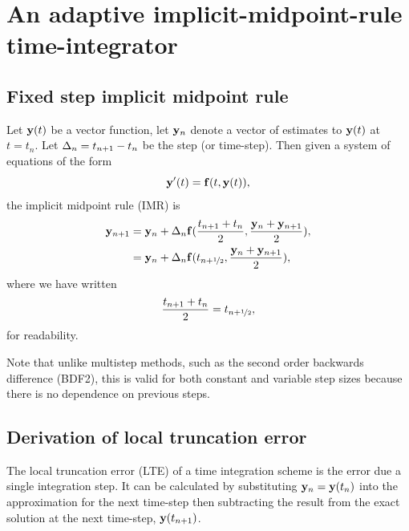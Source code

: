

\section{An adaptive implicit-midpoint-rule time-integrator}





\subsection{Fixed step implicit midpoint rule}

Let $\mathbf{y}(t)$ be a vector function, let $\mathbf{y}_n$ denote a vector of estimates to $\mathbf{y}(t)$ at $t = t_n$.
Let $\Delta_{n} = t_{n+1} - t_n$ be the step (or time-step).
Then given a system of equations of the form
\begin{equation}
  \mathbf{y}'(t) = {\mathbf{f}}(t, \mathbf{y}(t)),
  \label{eq:43}
\end{equation}
the implicit midpoint rule (IMR) is
\begin{align}
  \mathbf{y}_{n+1} &= \mathbf{y}_n + \Delta_{n} {\mathbf{f}}(\frac{t_{n+1} + t_n}{2}, \frac{\mathbf{y}_n + \mathbf{y}_{n+1}}{2}), \notag\\
  &= \mathbf{y}_n + \Delta_{n} {\mathbf{f}}(t_{n+\nicefrac{1}{2}}, \frac{\mathbf{y}_n + \mathbf{y}_{n+1}}{2}),
  \label{eq:basic-midpoint}
\end{align}
where we have written
\begin{equation}
  \frac{t_{n+1} + t_n}{2} = t_{n+\nicefrac{1}{2}},
\end{equation}
for readability.

Note that unlike multistep methods, such as the second order backwards difference (BDF2), this is valid for both constant and variable step sizes because there is no dependence on previous steps.


\subsection{Derivation of local truncation error}
\label{sec:deriv-local-trunc}

The local truncation error (LTE) of a time integration scheme is the error due a single integration step.
It can be calculated by substituting $\mathbf{y}_n = \mathbf{y}(t_n)$ into the approximation for the next time-step then subtracting the result from the exact solution at the next time-step, $\mathbf{y}(t_{n+1})$.

